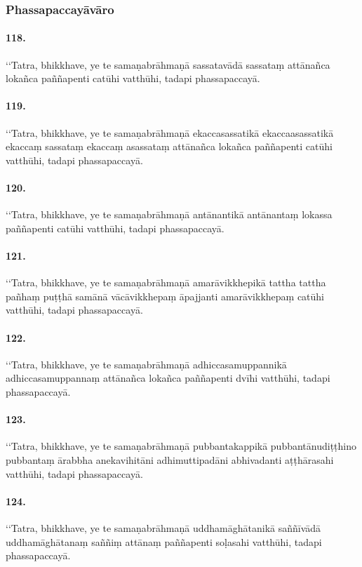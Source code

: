 \subsubsection{Phassapaccayāvāro}

\paragraph{118.}
‘‘Tatra, bhikkhave, ye te samaṇabrāhmaṇā sassatavādā sassataṃ attānañca lokañca paññapenti catūhi vatthūhi, tadapi phassapaccayā.

\paragraph{119.}
‘‘Tatra, bhikkhave, ye te samaṇabrāhmaṇā ekaccasassatikā ekaccaasassatikā ekaccaṃ sassataṃ ekaccaṃ asassataṃ attānañca lokañca paññapenti catūhi vatthūhi, tadapi phassapaccayā.

\paragraph{120.}
‘‘Tatra, bhikkhave, ye te samaṇabrāhmaṇā antānantikā antānantaṃ lokassa paññapenti catūhi vatthūhi, tadapi phassapaccayā.

\paragraph{121.}
‘‘Tatra, bhikkhave, ye te samaṇabrāhmaṇā amarāvikkhepikā tattha tattha pañhaṃ puṭṭhā samānā vācāvikkhepaṃ āpajjanti amarāvikkhepaṃ catūhi vatthūhi, tadapi phassapaccayā.

\paragraph{122.}
‘‘Tatra, bhikkhave, ye te samaṇabrāhmaṇā adhiccasamuppannikā adhiccasamuppannaṃ attānañca lokañca paññapenti dvīhi vatthūhi, tadapi phassapaccayā.

\paragraph{123.}
‘‘Tatra, bhikkhave, ye te samaṇabrāhmaṇā pubbantakappikā pubbantānudiṭṭhino pubbantaṃ ārabbha anekavihitāni adhimuttipadāni abhivadanti aṭṭhārasahi vatthūhi, tadapi phassapaccayā.

\paragraph{124.}
‘‘Tatra, bhikkhave, ye te samaṇabrāhmaṇā uddhamāghātanikā saññīvādā uddhamāghātanaṃ saññiṃ attānaṃ paññapenti soḷasahi vatthūhi, tadapi phassapaccayā.

